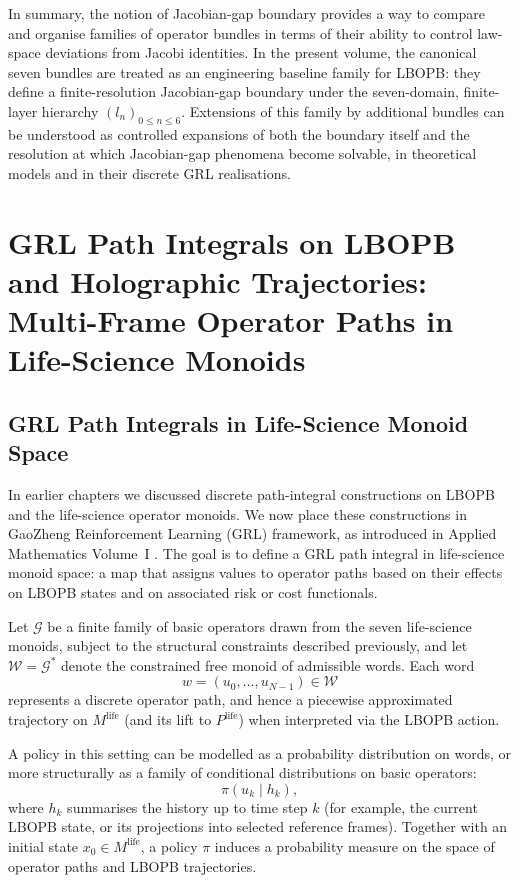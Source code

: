 \documentclass[11pt]{book}
\theoremstyle{plain}
\theoremstyle{definition}
\theoremstyle{remark}
\begin{document}
In summary, the notion of Jacobian-gap boundary provides a way to
compare and organise families of operator bundles in terms of their
ability to control law-space deviations from Jacobi identities.
In the present volume, the canonical seven bundles are treated as an
engineering baseline family for LBOPB: they define a finite-resolution
Jacobian-gap boundary under the seven-domain, finite-layer hierarchy
$(l_n)_{0\le n\le 6}$.
Extensions of this family by additional bundles can be understood as
controlled expansions of both the boundary itself and the resolution at
which Jacobian-gap phenomena become solvable, in theoretical models and
in their discrete GRL realisations.

\chapter[GRL Path Integrals on LBOPB and Holographic Trajectories]{GRL Path Integrals on LBOPB and Holographic Trajectories:\\
         Multi-Frame Operator Paths in Life-Science Monoids}


\section{GRL Path Integrals in Life-Science Monoid Space}


In earlier chapters we discussed discrete path-integral constructions
on LBOPB and the life-science operator monoids. We now place these
constructions in GaoZheng Reinforcement Learning (GRL) framework,
as introduced in Applied Mathematics Volume~I \cite{GaoZhengAppVol1}.
The goal is to define a GRL path integral in life-science monoid
space: a map that assigns values to operator paths based on their
effects on LBOPB states and on associated risk or cost functionals.

Let $\mathcal{G}$ be a finite family of basic operators drawn from the
seven life-science monoids, subject to the structural constraints
described previously, and let $\mathcal{W} = \mathcal{G}^{*}$ denote
the constrained free monoid of admissible words. Each word
\[
  w = (u_{0},\dots,u_{N-1}) \in \mathcal{W}
\]
represents a discrete operator path, and hence a piecewise
approximated trajectory on $M^{\mathrm{life}}$ (and its lift to
$P^{\mathrm{life}}$) when interpreted via the LBOPB action.

A policy in this setting can be modelled as a probability distribution
on words, or more structurally as a family of conditional distributions
on basic operators:
\[
  \pi(u_{k} \mid h_{k}),
\]
where $h_{k}$ summarises the history up to time step $k$ (for example,
the current LBOPB state, or its projections into selected reference
frames). Together with an initial state $x_{0} \in M^{\mathrm{life}}$,
a policy $\pi$ induces a probability measure on the space of operator
paths and LBOPB trajectories.
\end{document}
